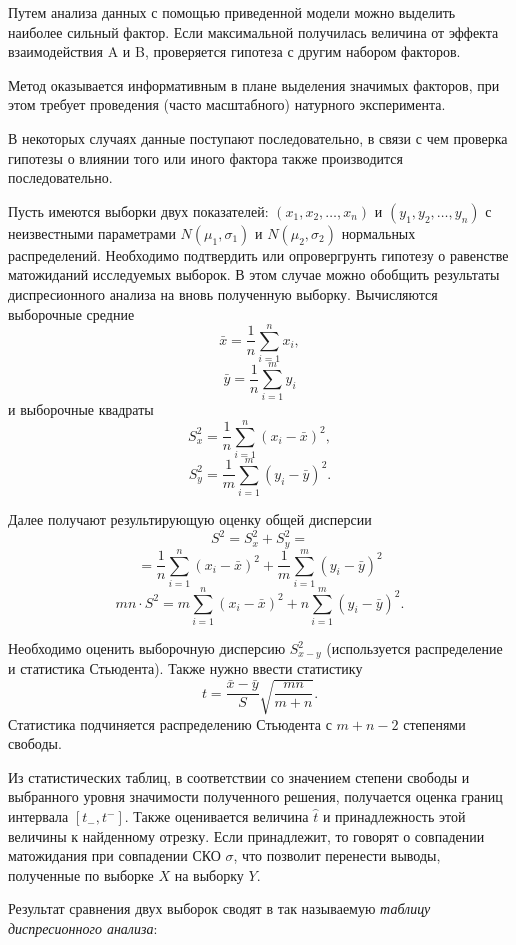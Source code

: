 \documentclass[12pt]{article}
\begin{document}
Путем анализа данных с помощью приведенной модели можно выделить наиболее сильный фактор. Если максимальной получилась величина от эффекта взаимодействия A и B, проверяется гипотеза с другим набором факторов.

Метод оказывается информативным в плане выделения значимых факторов, при этом требует проведения (часто масштабного) натурного эксперимента.

В некоторых случаях данные поступают последовательно, в связи с чем проверка гипотезы о влиянии того или иного фактора также производится последовательно.

Пусть имеются выборки двух показателей: $(x_1, x_2, \ldots, x_n)$ и $(y_1, y_2, \ldots, y_n)$ с неизвестными параметрами $N(\mu_1, \sigma_1)$ и $N(\mu_2, \sigma_2)$ нормальных распределений. Необходимо подтвердить или опровергрунть гипотезу о равенстве матожиданий исследуемых выборок. В этом случае можно обобщить результаты диспресионного анализа на вновь полученную выборку. Вычисляются выборочные средние
\[ \bar{x} = \frac{1}{n} \sum_{i=1}^n x_i,\]
\[ \bar{y} = \frac{1}{n} \sum_{i=1}^m y_i\]
и выборочные квадраты
\[ S_x^2 = \frac{1}{n} \sum_{i=1}^n (x_i - \bar{x})^2,\]
\[ S_y^2 = \frac{1}{m} \sum_{i=1}^m (y_i - \bar{y})^2.\]

Далее получают результирующую оценку общей дисперсии
\[ S^2 = S_x^2 + S_y^2 = \]
\[ = \frac{1}{n} \sum_{i=1}^n (x_i - \bar{x})^2 + \frac{1}{m} \sum_{i=1}^m (y_i - \bar{y})^2 \]
\[ mn \cdot S^2 = m \sum_{i=1}^n (x_i - \bar{x})^2 + n \sum_{i=1}^m (y_i - \bar{y})^2.\]

Необходимо оценить выборочную дисперсию $S_{x-y}^2$ (используется распределение и статистика Стьюдента). Также нужно ввести статистику
\[ t = \frac{\bar{x} - \bar{y}}{S} \sqrt{\frac{mn}{m + n}}. \]
Статистика подчиняется распределению Стьюдента с $m + n - 2$ степенями свободы.

Из статистических таблиц, в соответствии со значением степени свободы и выбранного уровня значимости полученного решения, получается оценка границ интервала $[t_{-}, t^{-}]$. Также оценивается величина $\hat{t}$ и принадлежность этой величины к найденному отрезку. Если принадлежит, то говорят о совпадении матожидания при совпадении СКО $\sigma$, что позволит перенести выводы, полученные по выборке $X$ на выборку $Y$.

\newpage
Результат сравнения двух выборок сводят в так называемую \emph{таблицу диспресионного анализа}:
\end{document}
